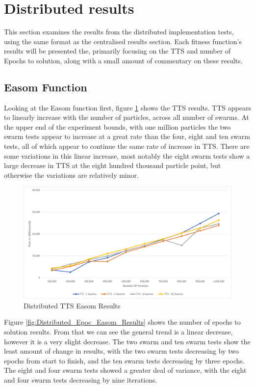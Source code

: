 \documentclass[oneside,12pt]{book}
\begin{document}
\section{Distributed results}
This section examines the results from the distributed implementation tests, using the same format as the centralised results section. Each fitness function's results will be presented the, primarily focusing on the TTS and number of Epochs to solution, along with a small amount of commentary on these results. 

\subsection{Easom Function}
Looking at the Easom function first, figure \ref{fig:Distributed_TTS_Easom_Results} shows the TTS results. TTS appears to linearly increase with the number of particles, across all number of swarms. At the upper end of the experiment bounds, with one million particles the two swarm tests appear to increase at a great rate than the four, eight and ten swarm tests, all of which appear to continue the same rate of increase in TTS. There are some variations in this linear increase, most notably the eight swarm tests show a large decrease in TTS at the eight hundred thousand particle point, but otherwise the variations are relatively minor. 

\begin{figure}[H]
    \centering
    \includegraphics[scale=0.45]{Images/Graphs/DistributedEasomTTS.png}
    \caption{Distributed TTS Easom Results}
    \label{fig:Distributed_TTS_Easom_Results}
\end{figure}

Figure \ref{fig:Distributed_Epoc_Easom_Results} shows the number of epochs to solution results. From that we can see the general trend is a linear decrease, however it is a very slight decrease. The two swarm and ten swarm tests show the least amount of change in results, with the two swarm tests decreasing by two epochs from start to finish, and the ten swarm tests decreasing by three epochs. The eight and four swarm tests showed a greater deal of variance, with the eight and four swarm tests decreasing by nine iterations.
\end{document}
